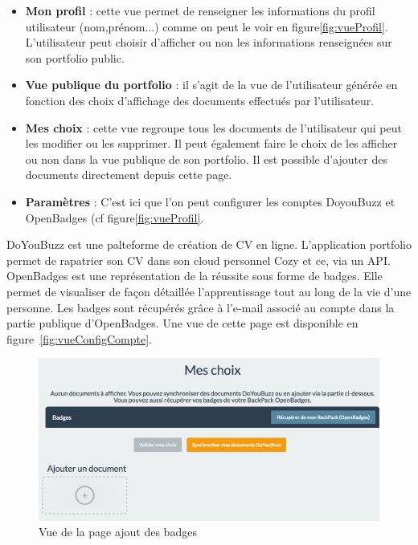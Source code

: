 \begin{itemize}
    \item\textbf{Mon profil} : cette vue permet de renseigner les informations du profil utilisateur (nom,prénom...) comme on peut le voir en figure\ref{fig:vueProfil}. L'utilisateur peut choisir d'afficher ou non les informations renseignées sur son portfolio public. 
    \item \textbf{Vue publique du portfolio} : il s'agit de la vue de l'utilisateur générée en fonction des choix d'affichage des documents effectués par l'utilisateur. 
    \item \textbf{Mes choix} : cette vue regroupe tous les documents de l'utilisateur qui peut les modifier ou les supprimer. Il peut également faire le choix de les afficher ou non dans la vue publique de son portfolio. Il est possible d'ajouter des documents directement depuis cette page. 
     \item \textbf{Paramètres} : C'est ici que l'on peut configurer les comptes DoyouBuzz et OpenBadges (cf figure\ref{fig:vueProfil}.    
\end{itemize}

DoYouBuzz est une palteforme de création de CV en ligne. L'application portfolio permet de rapatrier son CV dans son cloud personnel Cozy et ce, via un API. OpenBadges est une représentation de la réussite sous forme de badges. Elle permet de visualiser de façon détaillée l'apprentissage tout au long de la vie d'une personne. Les badges sont récupérés  grâce à l'e-mail associé au compte dans la partie publique d'OpenBadges. Une vue de cette page est disponible en figure~\ref{fig:vueConfigCompte}. 


\begin{figure}[!ht]
\begin{center}
\includegraphics[scale = 0.3]{img/ajout-badges.png}
\end{center}
\caption{Vue de la page ajout des badges}
\label{fig:vueBadge} 
\end{figure}


